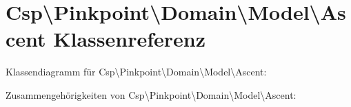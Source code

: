 \hypertarget{classCsp_1_1Pinkpoint_1_1Domain_1_1Model_1_1Ascent}{}\section{Csp\textbackslash{}Pinkpoint\textbackslash{}Domain\textbackslash{}Model\textbackslash{}Ascent Klassenreferenz}
\label{classCsp_1_1Pinkpoint_1_1Domain_1_1Model_1_1Ascent}


Klassendiagramm für Csp\textbackslash{}Pinkpoint\textbackslash{}Domain\textbackslash{}Model\textbackslash{}Ascent\+:


Zusammengehörigkeiten von Csp\textbackslash{}Pinkpoint\textbackslash{}Domain\textbackslash{}Model\textbackslash{}Ascent\+:

